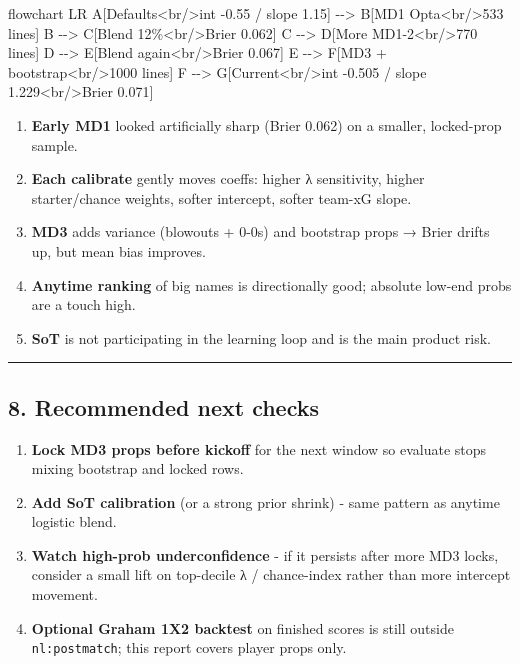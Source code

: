 \documentclass[
]{article}
\newenvironment{Shaded}{\begin{snugshade}}{\end{snugshade}}
\newcommand{\NormalTok}[1]{#1}
\providecommand{\tightlist}{%
  \setlength{\itemsep}{0pt}\setlength{\parskip}{0pt}}
\begin{document}
\begin{Shaded}
\begin{Highlighting}[]
\NormalTok{flowchart LR}
\NormalTok{  A[Defaults\textless{}br/\textgreater{}int {-}0.55 / slope 1.15] {-}{-}\textgreater{} B[MD1 Opta\textless{}br/\textgreater{}533 lines]}
\NormalTok{  B {-}{-}\textgreater{} C[Blend 12\%\textless{}br/\textgreater{}Brier 0.062]}
\NormalTok{  C {-}{-}\textgreater{} D[More MD1{-}2\textless{}br/\textgreater{}770 lines]}
\NormalTok{  D {-}{-}\textgreater{} E[Blend again\textless{}br/\textgreater{}Brier 0.067]}
\NormalTok{  E {-}{-}\textgreater{} F[MD3 + bootstrap\textless{}br/\textgreater{}1000 lines]}
\NormalTok{  F {-}{-}\textgreater{} G[Current\textless{}br/\textgreater{}int {-}0.505 / slope 1.229\textless{}br/\textgreater{}Brier 0.071]}
\end{Highlighting}
\end{Shaded}

\begin{enumerate}
\def\labelenumi{\arabic{enumi}.}
\tightlist
\item
  \textbf{Early MD1} looked artificially sharp (Brier 0.062) on a
  smaller, locked-prop sample.
\item
  \textbf{Each calibrate} gently moves coeffs: higher λ sensitivity,
  higher starter/chance weights, softer intercept, softer team-xG slope.
\item
  \textbf{MD3} adds variance (blowouts + 0-0s) and bootstrap props →
  Brier drifts up, but mean bias improves.
\item
  \textbf{Anytime ranking} of big names is directionally good; absolute
  low-end probs are a touch high.
\item
  \textbf{SoT} is not participating in the learning loop and is the main
  product risk.
\end{enumerate}

\begin{center}\rule{0.5\linewidth}{0.5pt}\end{center}

\subsection{8. Recommended next checks}\label{recommended-next-checks}

\begin{enumerate}
\def\labelenumi{\arabic{enumi}.}
\tightlist
\item
  \textbf{Lock MD3 props before kickoff} for the next window so evaluate
  stops mixing bootstrap and locked rows.
\item
  \textbf{Add SoT calibration} (or a strong prior shrink) - same pattern
  as anytime logistic blend.
\item
  \textbf{Watch high-prob underconfidence} - if it persists after more
  MD3 locks, consider a small lift on top-decile λ / chance-index rather
  than more intercept movement.
\item
  \textbf{Optional Graham 1X2 backtest} on finished scores is still
  outside \texttt{nl:postmatch}; this report covers player props only.
\end{enumerate}
\end{document}
